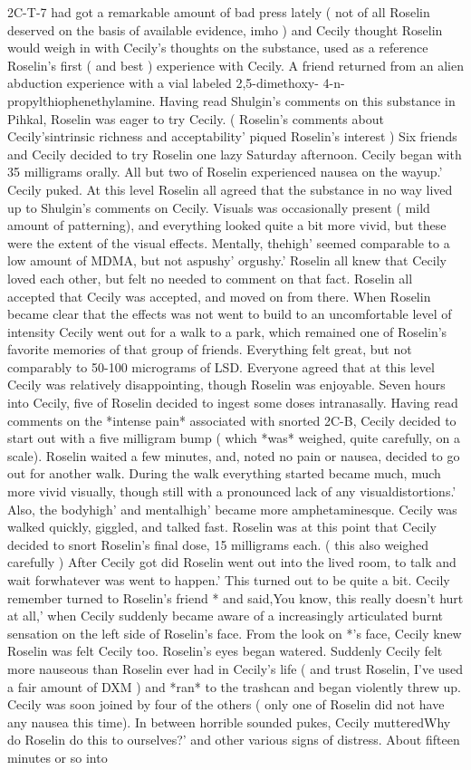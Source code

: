 \documentclass[12pt]{book}
\begin{document}
2C-T-7 had got a remarkable amount of bad press lately ( not of all Roselin deserved on the basis of available evidence, imho ) and Cecily thought Roselin would weigh in with Cecily's thoughts on the substance, used as a reference Roselin's first ( and best ) experience with Cecily. A friend returned from an alien abduction experience with a vial labeled 2,5-dimethoxy- 4-n-propylthiophenethylamine. Having read Shulgin's comments on this substance in Pihkal, Roselin was eager to try Cecily. ( Roselin's comments about Cecily'sintrinsic richness and acceptability' piqued Roselin's interest ) Six friends and Cecily decided to try Roselin one lazy Saturday afternoon. Cecily began with 35 milligrams orally. All but two of Roselin experienced nausea on the wayup.' Cecily puked. At this level Roselin all agreed that the substance in no way lived up to Shulgin's comments on Cecily. Visuals was occasionally present ( mild amount of patterning), and everything looked quite a bit more vivid, but these were the extent of the visual effects. Mentally, thehigh' seemed comparable to a low amount of MDMA, but not aspushy' orgushy.' Roselin all knew that Cecily loved each other, but felt no needed to comment on that fact. Roselin all accepted that Cecily was accepted, and moved on from there. When Roselin became clear that the effects was not went to build to an uncomfortable level of intensity Cecily went out for a walk to a park, which remained one of Roselin's favorite memories of that group of friends. Everything felt great, but not comparably to 50-100 micrograms of LSD. Everyone agreed that at this level Cecily was relatively disappointing, though Roselin was enjoyable. Seven hours into Cecily, five of Roselin decided to ingest some doses intranasally. Having read comments on the *intense pain* associated with snorted 2C-B, Cecily decided to start out with a five milligram bump ( which *was* weighed, quite carefully, on a scale). Roselin waited a few minutes, and, noted no pain or nausea, decided to go out for another walk. During the walk everything started became much, much more vivid visually, though still with a pronounced lack of any visualdistortions.' Also, the bodyhigh' and mentalhigh' became more amphetaminesque. Cecily was walked quickly, giggled, and talked fast. Roselin was at this point that Cecily decided to snort Roselin's final dose, 15 milligrams each. ( this also weighed carefully ) After Cecily got did Roselin went out into the lived room, to talk and wait forwhatever was went to happen.' This turned out to be quite a bit. Cecily remember turned to Roselin's friend * and said,You know, this really doesn't hurt at all,' when Cecily suddenly became aware of a increasingly articulated burnt sensation on the left side of Roselin's face. From the look on *'s face, Cecily knew Roselin was felt Cecily too. Roselin's eyes began watered. Suddenly Cecily felt more nauseous than Roselin ever had in Cecily's life ( and trust Roselin, I've used a fair amount of DXM ) and *ran* to the trashcan and began violently threw up. Cecily was soon joined by four of the others ( only one of Roselin did not have any nausea this time). In between horrible sounded pukes, Cecily mutteredWhy do Roselin do this to ourselves?' and other various signs of distress. About fifteen minutes or so into 
\end{document}
